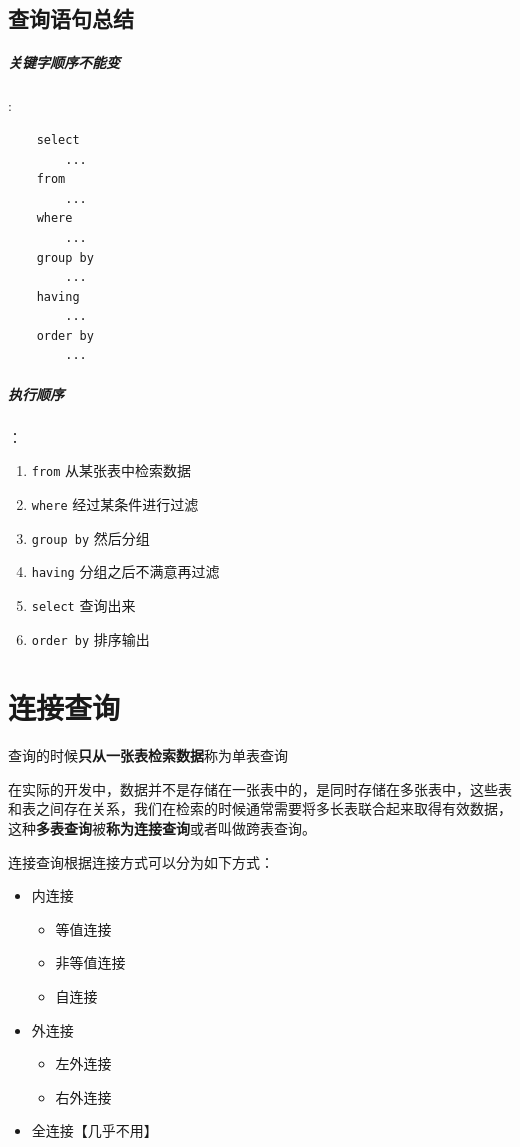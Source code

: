 \documentclass[UTF8,a4paper,12pt]{ctexbook}
\begin{document}
			
			\subsection{查询语句总结}
			
				\subparagraph{关键字顺序不能变}:
				
					\begin{lstlisting}
	select 
		...
	from
		...
	where
		...
	group by
		...
	having
		...
	order by
		...
					\end{lstlisting}
			
				\subparagraph{执行顺序}：
					\begin{enumerate}[itemindent = 2em]
						\item \verb|from| 从某张表中检索数据
						\item \verb|where| 经过某条件进行过滤
						\item \verb|group by| 然后分组
						\item \verb|having| 分组之后不满意再过滤
						\item \verb|select| 查询出来
						\item \verb|order by| 排序输出
					\end{enumerate}
		
\section{连接查询}
	查询的时候\textbf{只从一张表检索数据}称为单表查询
	
	在实际的开发中，数据并不是存储在一张表中的，是同时存储在多张表中，这些表和表之间存在关系，我们在检索的时候通常需要将多长表联合起来取得有效数据，这种\textbf{多表查询}被\textbf{称为连接查询}或者叫做跨表查询。
	
	连接查询根据连接方式可以分为如下方式：
		\begin{itemize}[itemindent = 2em]
			\item  内连接
				\begin{itemize}[itemindent = 3em]
					\item 等值连接
					\item 非等值连接
					\item 自连接
				\end{itemize}
				
			\item  外连接
				\begin{itemize}[itemindent = 3em]
					\item 左外连接
					\item 右外连接
				\end{itemize}
				
			\item  全连接【几乎不用】
		\end{itemize}
		
\end{document}
